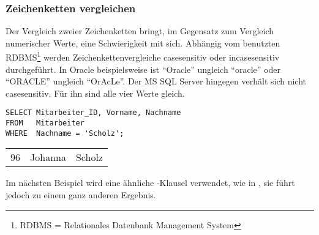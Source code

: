 \subsubsection{Zeichenketten vergleichen}
\label{stringdiff}
Der Vergleich zweier Zeichenketten bringt, im Gegensatz zum Vergleich numerischer Werte, eine Schwierigkeit mit sich. Abhängig vom benutzten RDBMS\footnote{RDBMS = Relationales Datenbank Management System} werden Zeichenkettenvergleiche casesensitiv oder incasesensitiv durchgeführt. In Oracle beispielsweise ist \enquote{Oracle} ungleich \enquote{oracle} oder \enquote{ORACLE} ungleich \enquote{OrAcLe}. Der MS SQL Server hingegen verhält sich nicht casesensitiv. Für ihn sind alle vier Werte gleich.

\begin{lstlisting}[language=oracle_sql,caption={Ein einfacher Zeichenkettenvergleich},label=sql02_06]
SELECT Mitarbeiter_ID, Vorname, Nachname
FROM   Mitarbeiter
WHERE  Nachname = 'Scholz';
          \end{lstlisting}
\begin{center}
    \begin{small}
        \tablehead{}
        \tabletail{
        }
        \begin{msoraclesql}
            \begin{supertabular}{rll}
                96 & Johanna & Scholz \\
            \end{supertabular}
        \end{msoraclesql}
    \end{small}
\end{center}
Im nächsten Beispiel wird eine ähnliche -Klausel verwendet, wie in , sie führt jedoch zu einem ganz anderen Ergebnis.

